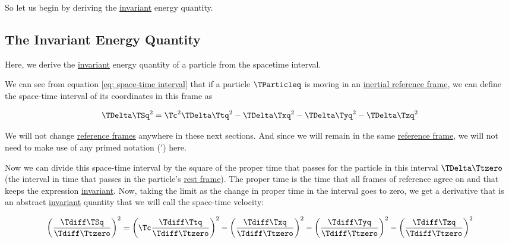 So let us begin by deriving the \hyperlink{def-lorentz-invariant}{invariant} energy quantity.

\subsection{The Invariant Energy Quantity}\label{subsect: The Invariant Energy Quantity}

Here, we derive the \hyperlink{def-lorentz-invariant}{invariant} energy quantity of a particle from the spacetime interval.

\begin{derivation}

	We can see from equation \eqref{eq: space-time interval} that if a particle $\TParticleq $ is moving in an \hyperlink{def-Inertial-reference-frame}{inertial reference frame}, we can define the space-time interval of its coordinates in this frame as

	\begin{equation}
		\TDelta  \TSq ^2 = \Tc ^2\TDelta  \Ttq ^2 - \TDelta  \Txq ^2 - \TDelta  \Tyq ^2- \TDelta  \Tzq ^2
	\end{equation}

	We will not change \hyperlink{def-Reference-frame}{reference frames} anywhere in these next sections.
	And since we will remain in the same \hyperlink{def-Reference-frame}{reference frame}, we will not need to make use of any primed notation ($'$) here.

	Now we can divide this space-time interval by the square of the proper time that passes for the particle in this interval ${\TDelta \Ttzero }$ (the interval in time that passes in the particle's \hyperlink{def-proper-frame}{rest frame}).
	The proper time is the time that all frames of reference agree on and that keeps the expression \hyperlink{def-lorentz-invariant}{invariant}.
	Now, taking the limit as the change in proper time in the interval goes to zero, we get a derivative that is an abstract \hyperlink{def-lorentz-invariant}{invariant} quantity that we will call the space-time velocity:

	\begin{equation}
		\left(\frac{\Tdiff \TSq }{\Tdiff \Ttzero }\right)^2 = \left(\Tc \frac{ { \Tdiff \Ttq  } }{\Tdiff \Ttzero }\right)^2-\left(\frac{\Tdiff \Txq }{\Tdiff \Ttzero }\right)^2-\left(\frac{\Tdiff \Tyq }{\Tdiff \Ttzero }\right)^2-\left(\frac{\Tdiff \Tzq }{\Tdiff \Ttzero }\right)^2
	\end{equation}


\end{derivation}
